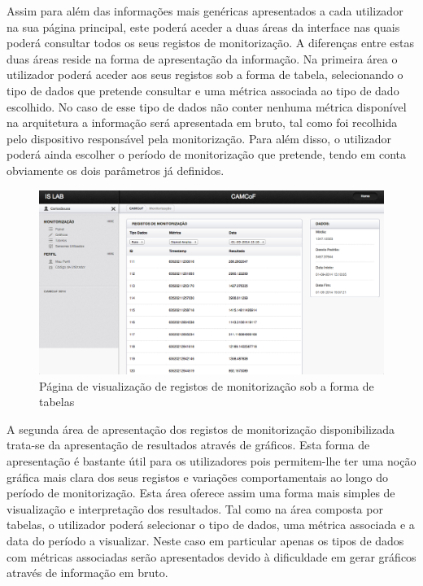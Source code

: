 Assim para além das informações mais genéricas apresentados a cada utilizador na sua página principal, este poderá aceder a duas áreas da interface nas quais poderá consultar todos os seus registos de monitorização. A diferenças entre estas duas áreas reside na forma de apresentação da informação. Na primeira área o utilizador poderá aceder aos seus registos sob a forma de tabela, selecionando o tipo de dados que pretende consultar e uma métrica associada ao tipo de dado escolhido. No caso de esse tipo de dados não conter nenhuma métrica disponível na arquitetura a informação será apresentada em bruto, tal como foi recolhida pelo dispositivo responsável pela monitorização. Para além disso, o utilizador poderá ainda escolher o período de monitorização que pretende, tendo em conta obviamente os dois parâmetros já definidos.

 \begin{figure}[htb]
   \centering
   \includegraphics[scale=0.29]{Images/tables1.png}
   \caption{Página de visualização de registos de monitorização sob a forma de tabelas}
\end{figure}

A segunda área de apresentação dos registos de monitorização disponibilizada trata-se da apresentação de resultados através de gráficos. Esta forma de apresentação é bastante útil para os utilizadores pois permitem-lhe ter uma noção gráfica mais clara dos seus registos e variações comportamentais ao longo do período de monitorização. Esta área oferece assim uma forma mais simples de visualização e interpretação dos resultados. Tal como na área composta por tabelas, o utilizador poderá selecionar o tipo de dados, uma métrica associada e a data do período a visualizar. Neste caso em particular apenas os tipos de dados com métricas associadas serão apresentados devido à dificuldade em gerar gráficos através de informação em bruto.

